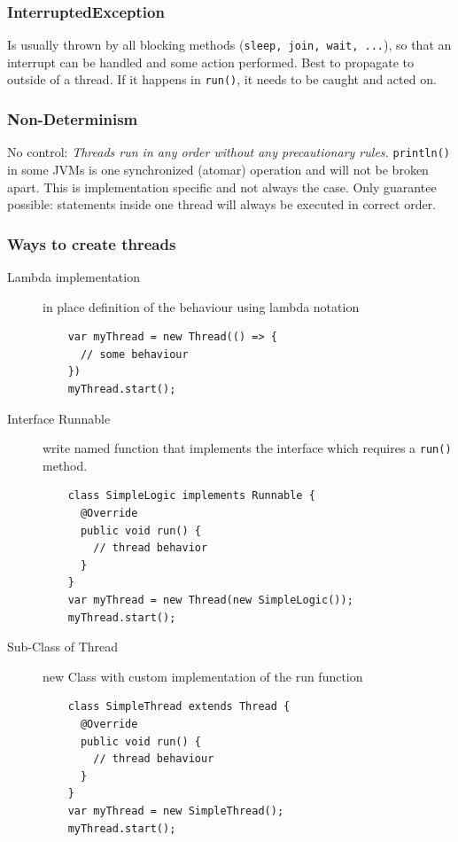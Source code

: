 \subsubsection{InterruptedException}
Is usually thrown by all blocking methods (\texttt{sleep, join, wait, ...}), so that an interrupt can be handled and some action performed. Best to propagate to outside of a thread. If it happens in \texttt{run()}, it needs to be caught and acted on.

\subsubsection{Non-Determinism}
No control: \textit{Threads run in any order without any precautionary rules.} \texttt{println()} in some JVMs is one synchronized (atomar) operation and will not be broken apart. This is implementation specific and not always the case. 
Only guarantee possible: statements inside one thread will always be executed in correct order.

\subsubsection{Ways to create threads}

\begin{description}
  \item[Lambda implementation] in place definition of the behaviour using lambda notation
  \begin{verbatim}
    var myThread = new Thread(() => {
      // some behaviour
    })
    myThread.start();
  \end{verbatim}

  \item[Interface Runnable] write named function that implements the interface which requires a \texttt{run()} method.
  \begin{verbatim}
    class SimpleLogic implements Runnable {
      @Override
      public void run() {
        // thread behavior
      }
    }
    var myThread = new Thread(new SimpleLogic());
    myThread.start();
  \end{verbatim}

  \item[Sub-Class of Thread] new Class with custom implementation of the run function
  \begin{verbatim}
    class SimpleThread extends Thread {
      @Override
      public void run() {
        // thread behaviour
      }
    }
    var myThread = new SimpleThread();
    myThread.start();
  \end{verbatim}
\end{description}


